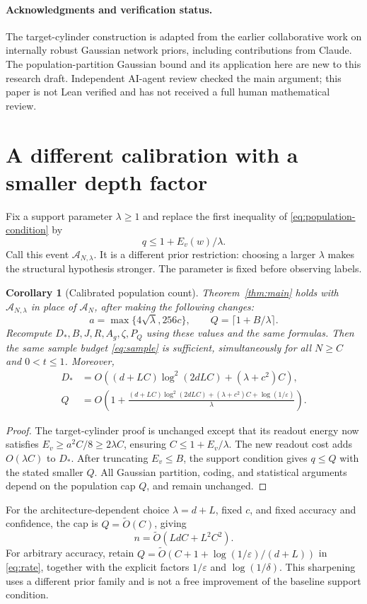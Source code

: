 \documentclass[11pt]{article}
\newtheorem{corollary}[theorem]{Corollary}
\begin{document}
\paragraph{Acknowledgments and verification status.}
The target-cylinder construction is adapted from the earlier collaborative
work on internally robust Gaussian network priors, including contributions
from Claude. The population-partition Gaussian bound and its application
here are new to this research draft. Independent AI-agent review checked
the main argument; this paper is not Lean verified and has not received a
full human mathematical review.

\appendix
\section{A different calibration with a smaller depth factor}
\label{app:calibration}

Fix a support parameter $\lambda\ge1$ and replace the first inequality of
\eqref{eq:population-condition} by
\begin{equation}\label{eq:lambda-condition}
 q\le1+E_v(w)/\lambda.
\end{equation}
Call this event $\mathcal A_{N,\lambda}$. It is a different prior
restriction: choosing a larger $\lambda$ makes the structural hypothesis
stronger. The parameter is fixed before observing labels.

\begin{corollary}[Calibrated population count]\label{cor:lambda}
Theorem~\ref{thm:main} holds with $\mathcal A_{N,\lambda}$ in place of
$\mathcal A_N$, after making the following changes:
\[
 a=\max\{4\sqrt\lambda,256c\},\qquad
 Q=\lceil1+B/\lambda\rceil.
\]
Recompute $D_*,B,J,R,A_g,\zeta,P_Q$ using these values and the same formulas.
Then the same sample budget \eqref{eq:sample} is sufficient, simultaneously
for all $N\ge C$ and $0<t\le1$. Moreover,
\begin{align*}
 D_*&=O((d+LC)\log^2(2dLC)+(\lambda+c^2)C),\\
 Q&=O\left(1+
 \frac{(d+LC)\log^2(2dLC)+(\lambda+c^2)C+\log(1/\varepsilon)}{\lambda}
 \right).
\end{align*}
\end{corollary}
\begin{proof}
The target-cylinder proof is unchanged except that its readout energy now
satisfies $E_v\ge a^2C/8\ge2\lambda C$, ensuring
$C\le1+E_v/\lambda$. The new readout cost adds $O(\lambda C)$ to $D_*$.
After truncating $E_v\le B$, the support condition gives $q\le Q$ with
the stated smaller $Q$. All Gaussian partition, coding, and statistical
arguments depend on the population cap $Q$, and remain unchanged.
\end{proof}

For the architecture-dependent choice $\lambda=d+L$, fixed $c$, and fixed
accuracy and confidence, the cap is $Q=\widetilde O(C)$, giving
\[
 n=\widetilde O(LdC+L^2C^2).
\]
For arbitrary accuracy, retain
$Q=\widetilde O(C+1+\log(1/\varepsilon)/(d+L))$ in
\eqref{eq:rate}, together with the explicit factors $1/\varepsilon$ and
$\log(1/\delta)$. This sharpening uses a different prior family and is
not a free improvement of the baseline support condition.
\end{document}
